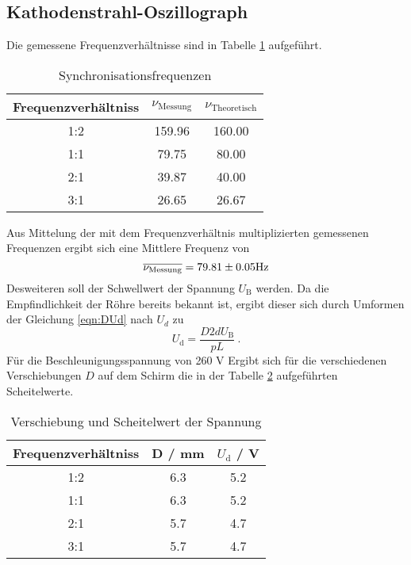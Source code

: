 \subsection{Kathodenstrahl-Oszillograph}
Die gemessene Frequenzverhältnisse sind in Tabelle \ref{tab:sync} aufgeführt.
\begin{table}
  \centering
  \begin{tabular}{c c c}
    \toprule
    Frequenzverhältniss & $\nu_\text{Messung}$ & $\nu_\text{Theoretisch}$ \\
    \midrule
    1:2	& 159.96& 160.00\\
    1:1	& 79.75 & 80.00	\\
    2:1	& 39.87 & 40.00	\\
    3:1	& 26.65 & 26.67	\\
    \bottomrule
  \end{tabular}
  \caption{Synchronisationsfrequenzen}
  \label{tab:sync}
\end{table}
Aus Mittelung der mit dem Frequenzverhältnis multiplizierten gemessenen Frequenzen ergibt sich eine Mittlere Frequenz von
\begin{equation}
  \overline{\nu_\text{Messung}} = \num{79.81 +- 0.05} \text{Hz}
  \label{eqn:numess}
\end{equation}
Desweiteren soll der Schwellwert der Spannung $U_\text{B}$ werden. Da die Empfindlichkeit der Röhre bereits bekannt ist, ergibt dieser sich durch Umformen der Gleichung \ref{eqn:DUd} nach $U_d$ zu
\begin{equation}
  U_\text{d} = \frac{D 2 d U_\text{B}}{p L} \ .
  \label{eqn:dfs}
\end{equation}
Für die Beschleunigungsspannung von 260 V Ergibt sich für die verschiedenen Verschiebungen $D$ auf dem Schirm die in der Tabelle \ref{tab:scheitel} aufgeführten Scheitelwerte.
\begin{table}
  \centering
  \begin{tabular}{c c c}
    \toprule
	Frequenzverhältniss & D / mm & $U_\text{d}$ / V \\
    \midrule
	1:2	& 6.3 & 5.2 	\\
	1:1	& 6.3 & 5.2	\\
	2:1	& 5.7 & 4.7	\\
	3:1	& 5.7 & 4.7	\\
    \bottomrule
  \end{tabular}
  \caption{Verschiebung und Scheitelwert der Spannung}
  \label{tab:scheitel}
\end{table}
